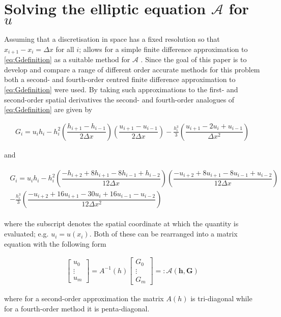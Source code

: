\documentclass[SingleSpace,12pt,Proceedings]{Serre_ASCE}
\begin{document}
\section{Solving the elliptic equation $\mathcal{A}$ for $u$}
Assuming that a discretisation in space has a fixed resolution so that $x_{i+1} - x_{i} = \Delta x$ for all $i$; allows for a simple finite difference approximation to \eqref{eq:Gdefinition} as a suitable method for $\mathcal{A}$ \cite{Hank-etal-2010-2034,Zoppou-2014}. Since the goal of this paper is to develop and compare a range of different order accurate methods for this problem both a second- and fourth-order centred finite difference approximation to \eqref{eq:Gdefinition} were used. By taking such approximations to the first- and second-order spatial derivatives the second- and fourth-order analogues of \eqref{eq:Gdefinition} are given by
\begin{linenomath*}
\begin{gather*} \tag{5a} \label{eq:Gsecondord}
G_i = u_ih_i - h_i^2 \left(\dfrac{h_{i+1} - h_{i-1}}{2\Delta x}\right) \left(\dfrac{u_{i+1} - u_{i-1}}{2\Delta x}\right) - \frac{h_i^3}{3} \left(\dfrac{u_{i+1} - 2 u_{i} + u_{i-1}}{\Delta x^2}\right)
\end{gather*}
\end{linenomath*}
and
\begin{linenomath*}
\begin{gather*} \tag{5b} \label{eq:Gfourthord}
\begin{split} 
G_i = u_ih_i - h_i^2 \left(\dfrac{-h_{i+2} + 8h_{i+1} - 8h_{i-1} + h_{i-2}}{12\Delta x}\right) \left(\dfrac{-u_{i+2} + 8u_{i+1} - 8u_{i-1} + u_{i-2}}{12\Delta x}\right) \\ - \frac{h_i^3}{3} \left(\dfrac{-u_{i+2} + 16u_{i+1} - 30u_{i} + 16u_{i-1} - u_{i-2}}{12\Delta x^2}\right)&
\end{split}
\end{gather*}
\end{linenomath*}
where the subscript denotes the spatial coordinate at which the quantity is evaluated; e.g. $u_i = u(x_i)$. Both of these can be rearranged into a matrix equation with the following form 
\begin{linenomath*}
\begin{gather*}
\left[\begin{array}{c}
  u_0 \\
  \vdots \\
  u_m \end{array}\right] = A^{-1}\left(h\right)
\left[\begin{array}{c}
 G_0 \\
 \vdots \\
 G_m \end{array}\right] =: \mathcal{A}(\boldsymbol{h},\boldsymbol{G})
\end{gather*}
\end{linenomath*}
where for a second-order approximation the matrix $A(h)$ is tri-diagonal while for a fourth-order method it is penta-diagonal.
\end{document}
